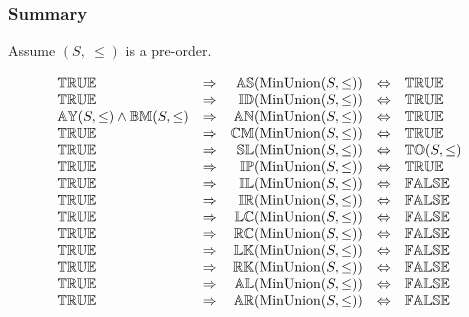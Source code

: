 \documentclass[../Summary.tex]{subfiles}
\begin{document}
\subsubsection{Summary}

Assume $(S,\ \leq)$ is a pre-order.

\[
\begin{array}{lcrcl} 
{\mathbb{TRUE}}
	& \Rightarrow
	& {\mathbb{AS}}(\mathrm{MinUnion}(S, \leq)) 
	& \Leftrightarrow 
	& {\mathbb{TRUE}} 
	\\ 
{\mathbb{TRUE}}
	& \Rightarrow
	& {\mathbb{ID}}(\mathrm{MinUnion}(S, \leq)) 
	& \Leftrightarrow 
	& {\mathbb{TRUE}}
	\\
{\mathbb{AY}}(S, \leq) \wedge {\mathbb{BM}}(S, \leq)
	& \Rightarrow
	& {\mathbb{AN}}(\mathrm{MinUnion}(S, \leq)) 
	& \Leftrightarrow 
	& {\mathbb{TRUE}}
	\\
{\mathbb{TRUE}}
	& \Rightarrow
	& {\mathbb{CM}}(\mathrm{MinUnion}(S, \leq)) 
	& \Leftrightarrow 
  	& {\mathbb{TRUE}}
	\\ 
{\mathbb{TRUE}}
	& \Rightarrow
	& {\mathbb{SL}}(\mathrm{MinUnion}(S, \leq)) 
	& \Leftrightarrow 
	& {\mathbb{TO}}(S, \leq)  
	\\ 
{\mathbb{TRUE}}
	& \Rightarrow
	& {\mathbb{IP}}(\mathrm{MinUnion}(S, \leq)) 
	& \Leftrightarrow 
	& {\mathbb{TRUE}}
	\\ 
{\mathbb{TRUE}}
	& \Rightarrow
	& {\mathbb{IL}}(\mathrm{MinUnion}(S, \leq)) 
	& \Leftrightarrow
	& {\mathbb{FALSE}} 
	\\
{\mathbb{TRUE}}
	& \Rightarrow
	& {\mathbb{IR}}(\mathrm{MinUnion}(S, \leq)) 
	& \Leftrightarrow
	& {\mathbb{FALSE}} 
	\\
{\mathbb{TRUE}}
	& \Rightarrow
	& {\mathbb{LC}}(\mathrm{MinUnion}(S, \leq)) 
	& \Leftrightarrow
	& {\mathbb{FALSE}} 
	\\
{\mathbb{TRUE}}
	& \Rightarrow
	& {\mathbb{RC}}(\mathrm{MinUnion}(S, \leq)) 
	& \Leftrightarrow
	& {\mathbb{FALSE}} 
	\\
{\mathbb{TRUE}}
	& \Rightarrow
	& {\mathbb{LK}}(\mathrm{MinUnion}(S, \leq)) 
	& \Leftrightarrow
	& {\mathbb{FALSE}} 
	\\
{\mathbb{TRUE}}
	& \Rightarrow
	& {\mathbb{RK}}(\mathrm{MinUnion}(S, \leq)) 
	& \Leftrightarrow
	& {\mathbb{FALSE}} 
	\\
{\mathbb{TRUE}}
	& \Rightarrow
	& {\mathbb{AL}}(\mathrm{MinUnion}(S, \leq))  
	& \Leftrightarrow
	& {\mathbb{FALSE}} 
	\\
{\mathbb{TRUE}}
	& \Rightarrow
	& {\mathbb{AR}}(\mathrm{MinUnion}(S, \leq))  
	& \Leftrightarrow
	& {\mathbb{FALSE}} 
	\\
\end{array} 
\] 
\end{document}

